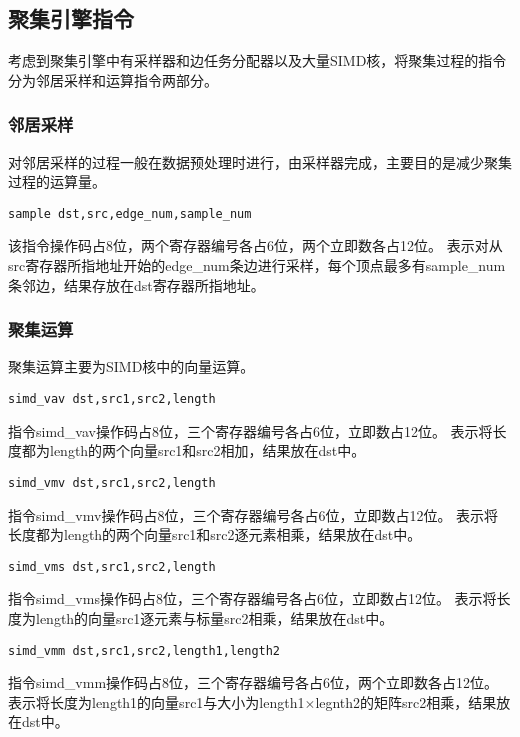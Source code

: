 \subsection{聚集引擎指令}
考虑到聚集引擎中有采样器和边任务分配器以及大量SIMD核，将聚集过程的指令分为邻居采样和运算指令两部分。

\subsubsection{邻居采样}
对邻居采样的过程一般在数据预处理时进行，由采样器完成，主要目的是减少聚集过程的运算量。
\begin{lstlisting}[language={[x86masm]Assembler}] 
    sample dst,src,edge_num,sample_num
\end{lstlisting}
该指令操作码占8位，两个寄存器编号各占6位，两个立即数各占12位。
表示对从src寄存器所指地址开始的edge\_num条边进行采样，每个顶点最多有sample\_num条邻边，结果存放在dst寄存器所指地址。

\subsubsection{聚集运算}
聚集运算主要为SIMD核中的向量运算。
\begin{lstlisting}[language={[x86masm]Assembler}]
    simd_vav dst,src1,src2,length
\end{lstlisting}
指令simd\_vav操作码占8位，三个寄存器编号各占6位，立即数占12位。
表示将长度都为length的两个向量src1和src2相加，结果放在dst中。

\begin{lstlisting}[language={[x86masm]Assembler}]
    simd_vmv dst,src1,src2,length
\end{lstlisting}
指令simd\_vmv操作码占8位，三个寄存器编号各占6位，立即数占12位。
表示将长度都为length的两个向量src1和src2逐元素相乘，结果放在dst中。

\begin{lstlisting}[language={[x86masm]Assembler}]
    simd_vms dst,src1,src2,length
\end{lstlisting}
指令simd\_vms操作码占8位，三个寄存器编号各占6位，立即数占12位。
表示将长度为length的向量src1逐元素与标量src2相乘，结果放在dst中。

\begin{lstlisting}[language={[x86masm]Assembler}]
    simd_vmm dst,src1,src2,length1,length2
\end{lstlisting}
指令simd\_vmm操作码占8位，三个寄存器编号各占6位，两个立即数各占12位。
表示将长度为length1的向量src1与大小为length1$\times$legnth2的矩阵src2相乘，结果放在dst中。

